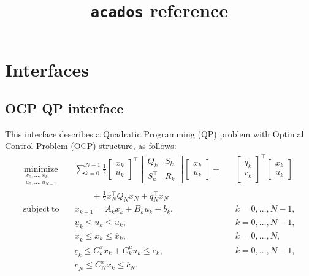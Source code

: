 \documentclass{report}
\title{\texttt{acados} reference}
\begin{document}
\maketitle

\chapter{Interfaces}

\section{OCP QP interface}
This interface describes a Quadratic Programming (QP) problem with Optimal Control Problem (OCP) structure, as follows:
\begin{subequations}
	\label{eq:OCP_QP}
	\begin{alignat}{3}
	\underset{\substack{x_0,\ldots,x_k \\ u_0,\ldots,u_{N-1}}}{\mathrm{minimize}} \quad & \sum_{k=0}^{N-1} \frac 1 2 \begin{bmatrix} x_k \\ u_k \end{bmatrix}^\top \begin{bmatrix} Q_k & S_k \\ S_k^\top & R_k \end{bmatrix} \begin{bmatrix} x_k \\ u_k \end{bmatrix} + &&\begin{bmatrix} q_k \\ r_k \end{bmatrix}^\top \begin{bmatrix} x_k \\ u_k \end{bmatrix} \\ & \qquad + \frac 1 2 x_N^\top Q_N x_N + q_N^\top x_N \nonumber \\
	\mathrm{subject~to} \quad & x_{k+1} = A_k x_k + B_k u_k + b_k, && k=0,\dots,N-1, \\
	& \underline u_k \leq u_k \leq \overline u_k, && k=0,\dots,N-1, \\
	& \underline x_k \leq x_k \leq \overline x_k, && k=0,\dots,N, \\
	& \underline c_k \leq C^x_k x_k + C^u_k u_k \leq \overline c_k, && k=0,\dots,N-1, \\
	& \underline c_N \leq C^x_N x_k \leq \overline c_N.
	\end{alignat}
\end{subequations}
\end{document}
